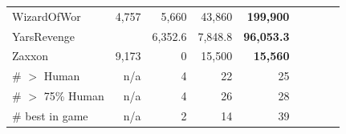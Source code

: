 {\begin{tabular}{lrrrrrrrl}
WizardOfWor      & 4,757                & 5,660          & 43,860          & \textbf{199,900}   \\
YarsRevenge      & \multicolumn{1}{l}{} & 6,352.6          & 7,848.8           & \textbf{96,053.3}    \\
Zaxxon           & 9,173                & 0              & 15,500          & \textbf{15,560}    \\
\midrule
\# $>$ Human  & n/a  & 4 & 22 & 25  \\
\# $>$ 75\% Human  & n/a  & 4 & 26 & 28  \\
\midrule
\# best in game & n/a & 2 & 14 &  39 \\
\bottomrule
\end{tabular}%
}
\caption{Score comparison in 55 Atari games. Scores in bold indicate the best width-based method, and a star indicates that the limit on executed actions was reached at least once. 
RolloutIW and VAE-IW are run with risk aversion.
} 
\label{tab:atari-lookahead-0.5}
